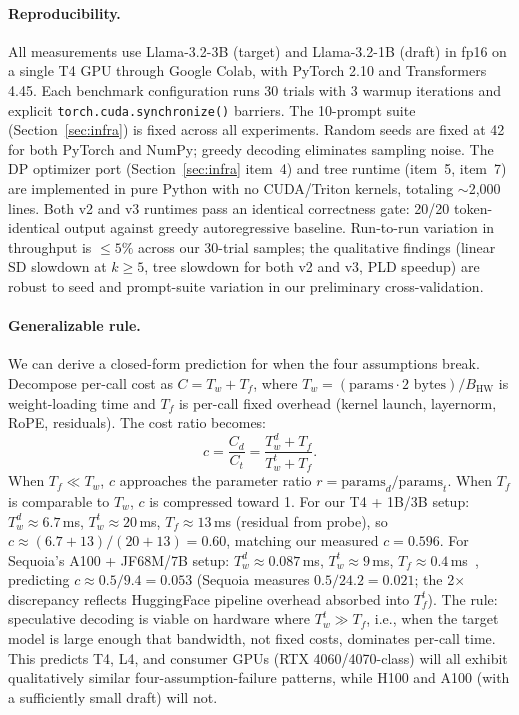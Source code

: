\documentclass[letterpaper,twocolumn,10pt]{article}
\begin{document}
\paragraph{Reproducibility.}
All measurements use Llama-3.2-3B (target) and Llama-3.2-1B (draft) in fp16 on a single T4 GPU through Google Colab, with PyTorch 2.10 and Transformers 4.45.
Each benchmark configuration runs 30 trials with 3 warmup iterations and explicit \texttt{torch.cuda.synchronize()} barriers.
The 10-prompt suite (Section~\ref{sec:infra}) is fixed across all experiments.
Random seeds are fixed at 42 for both PyTorch and NumPy; greedy decoding eliminates sampling noise.
The DP optimizer port (Section~\ref{sec:infra} item~4) and tree runtime (item~5, item~7) are implemented in pure Python with no CUDA/Triton kernels, totaling $\sim$2{,}000 lines.
Both v2 and v3 runtimes pass an identical correctness gate: 20/20 token-identical output against greedy autoregressive baseline.
Run-to-run variation in throughput is $\le 5\%$ across our 30-trial samples; the qualitative findings (linear SD slowdown at $k\geq 5$, tree slowdown for both v2 and v3, PLD speedup) are robust to seed and prompt-suite variation in our preliminary cross-validation.

\paragraph{Generalizable rule.}
We can derive a closed-form prediction for when the four assumptions break.
Decompose per-call cost as $C = T_w + T_f$, where $T_w = (\text{params} \cdot 2 \text{ bytes})/B_{\text{HW}}$ is weight-loading time and $T_f$ is per-call fixed overhead (kernel launch, layernorm, RoPE, residuals).
The cost ratio becomes:
\[
c = \frac{C_d}{C_t} = \frac{T_w^d + T_f}{T_w^t + T_f}.
\]
When $T_f \ll T_w$, $c$ approaches the parameter ratio $r = \text{params}_d/\text{params}_t$.
When $T_f$ is comparable to $T_w$, $c$ is compressed toward 1.
For our T4 + 1B/3B setup: $T_w^d \approx 6.7$\,ms, $T_w^t \approx 20$\,ms, $T_f \approx 13$\,ms (residual from probe), so $c \approx (6.7+13)/(20+13) = 0.60$, matching our measured $c=0.596$.
For Sequoia's A100 + JF68M/7B setup: $T_w^d \approx 0.087$\,ms, $T_w^t \approx 9$\,ms, $T_f \approx 0.4$\,ms~\cite{chen2024sequoia}, predicting $c \approx 0.5/9.4 = 0.053$ (Sequoia measures $0.5/24.2 = 0.021$; the 2$\times$ discrepancy reflects HuggingFace pipeline overhead absorbed into $T_f^t$).
The rule: speculative decoding is viable on hardware where $T_w^t \gg T_f$, i.e., when the target model is large enough that bandwidth, not fixed costs, dominates per-call time.
This predicts T4, L4, and consumer GPUs (RTX 4060/4070-class) will all exhibit qualitatively similar four-assumption-failure patterns, while H100 and A100 (with a sufficiently small draft) will not.
\end{document}

